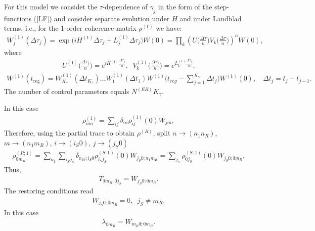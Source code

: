 \documentclass[pra,preprint,showpacs]{revtex4-1}
\begin{document}
{For this model we considet the $\tau$-dependence of  $\gamma_j$ in the form of the  step-functions (\ref{LF})
and consider separate evolution under $H$ and under Landblad terms, i.e., for the 1-order coherence matrix $\rho^{(1)}$ we have:
\begin{eqnarray}
W^{(1)}_j(\Delta\tau_j) = \exp\Big( i H^{(1)}\Delta \tau_j + L^{(1)}_j \Delta \tau_j  \Big)W(0) = \prod_k
\left(U\Big(\frac{\Delta \tau}{n}\Big) V_k\Big(\frac{\Delta \tau}{n}\Big)\right)^n W(0),
\end{eqnarray}
where
\begin{eqnarray}
U^{(1)}\Big(\frac{\Delta \tau_j}{n}\Big) = e^{ i H^{(1)}\frac{\Delta \tau_j}{n}},\;\;
V^{(1)}_k\Big(\frac{\Delta \tau_j}{n}\Big) = e^{  L^{(1)}_k \frac{\Delta \tau_j}{n}} .
\end{eqnarray}
\begin{eqnarray}\label{UtK}
W^{(1)}(t_{\mathrm{reg}})=  W^{(1)}_{K_\gamma}(\Delta t_{K_\gamma})\dots W^{(1)}_1(\Delta t_1) W^{(1)}\Big(t_{reg} - \sum_{j=1}^{K_\gamma} \Delta t_j\Big) W^{(1)}(0),\quad  \Delta t_j = t_j -t_{j-1}.
\end{eqnarray}
The number of control parameters equals $N^{(ER)} K_\gamma$.

In this case
\begin{eqnarray}
\rho^{(1)}_{nm} = \sum_{ij} \delta_{ni}\rho^{(1)}_{ij}(0) W_{jm},
\end{eqnarray}
Therefore, using the partial trace to obtain $\rho^{(R)}$, split $n\to (n_1 n_R)$, $m\to (n_1 m_R)$, $i\to (i_S 0)$,  $j\to (j_S 0)$
\begin{eqnarray}
\rho^{(R;1)}_{0m_R} =\sum_{n_1} \sum_{i_Sj_S} \delta_{n_10;i_S0}\rho^{(S;1)}_{i_Sj_S}(0) W_{j_S0;n_1m_R} =\sum_{j_S}\rho^{(S;1)}_{0j_S}(0) W_{j_S0;0m_R} .
\end{eqnarray}
Thus,
\begin{eqnarray}
T_{0m_R;0j_S} = W_{j_S0;0m_R}.
\end{eqnarray}
The restoring conditions read
\begin{eqnarray}
W_{j_S0;0m_R}=0, \;\;j_S\neq m_R .
\end{eqnarray}
In this case
\begin{eqnarray}
\lambda_{0m_R} =W_{m_R0;0m_R}.
\end{eqnarray}

}
\end{document}
